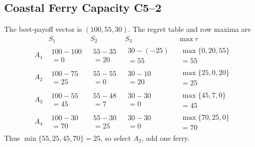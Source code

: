 \subsection{Coastal Ferry Capacity \hfill C5--2}
The best-payoff vector is $(100,55,30)$. The regret table and row maxima are
\[
\begin{array}{c|ccc|c}
 &S_1&S_2&S_3&\max r\\ \hline
A_1&\begin{gathered}100-100\\=0\end{gathered}&\begin{gathered}55-35\\=20\end{gathered}&\begin{gathered}30-(-25)\\=55\end{gathered}&\begin{gathered}\max\{0,20,55\}\\=55\end{gathered}\\[6pt]
A_2&\begin{gathered}100-75\\=25\end{gathered}&\begin{gathered}55-55\\=0\end{gathered}&\begin{gathered}30-10\\=20\end{gathered}&\begin{gathered}\max\{25,0,20\}\\=25\end{gathered}\\[6pt]
A_3&\begin{gathered}100-55\\=45\end{gathered}&\begin{gathered}55-48\\=7\end{gathered}&\begin{gathered}30-30\\=0\end{gathered}&\begin{gathered}\max\{45,7,0\}\\=45\end{gathered}\\[6pt]
A_4&\begin{gathered}100-30\\=70\end{gathered}&\begin{gathered}55-30\\=25\end{gathered}&\begin{gathered}30-30\\=0\end{gathered}&\begin{gathered}\max\{70,25,0\}\\=70\end{gathered}
\end{array}
\]
Thus $\min\{55,25,45,70\}=25$, so select $\boxed{A_2}$, add one ferry.

